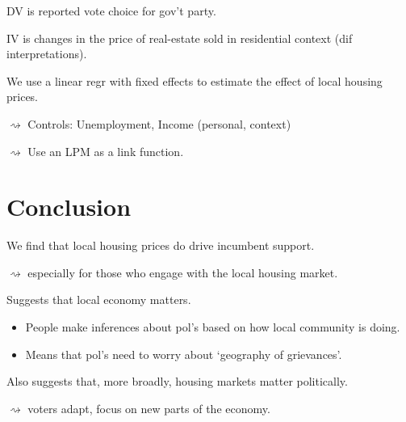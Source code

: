 \documentclass[aspectratio=169]{beamer}
\begin{document}
\begin{frame} 
	DV is reported vote choice for gov't party. \pause
	
	\vspace{0.2in} 
	IV is changes in the price of real-estate sold in residential context (dif interpretations).
	\vspace{0.2in}  \pause
	
	We use a linear regr with fixed effects to estimate the effect of local housing prices. \pause
	
	$\rightsquigarrow$ Controls: Unemployment, Income (personal, context) \pause
	
	$\rightsquigarrow$ Use an LPM as a link function. 
	
	
\end{frame}


\section{Conclusion}

\begin{frame}
We find that local housing prices do drive incumbent support. \pause

$\rightsquigarrow$ especially for those who engage with the local housing market. \pause

\vspace{0.2in}
Suggests that local economy matters. \pause
\begin{itemize}[<+->]
	\item People make inferences about pol's based on how local community is doing.
	\item Means that pol's need to worry about `geography of grievances'.
\end{itemize}

\vspace{0.2in} \pause
Also suggests that, more broadly, housing markets matter politically.

$\rightsquigarrow$ voters adapt, focus on new parts of the economy. 
\end{frame}
\end{document}
